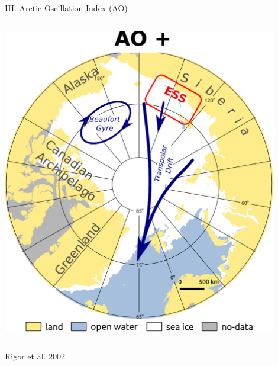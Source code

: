 \documentclass[8pt]{beamer}
\begin{document}
\begin{frame}[fragile]{III. Arctic Oscillation Index (AO)}
\begin{columns}
		\includegraphics[width=0.9\textwidth]{./img/AO+.pdf}\\

\end{columns}

Rigor et al. 2002
\end{frame}
\end{document}
